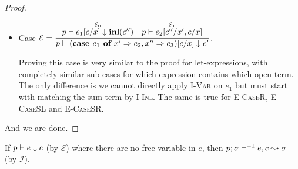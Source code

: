 \begin{proof}
\begin{itemize}
        An analogous proof occurs when $\mathcal{E}$ is a derivation of an
        inverse function call.

    \item Case $\mathcal{E} =
      \dfrac
        {\begin{array}{cc}
            \overset
              {\mathcal{E}_0}
              {p \vdash e_1 [c / x] \downarrow \textbf{inl}(c'')} &
            \overset
              {\mathcal{E}_1}
              {p \vdash e_2 [c'' / x', c / x]}
         \end{array}
        }
        {p \vdash (\textbf{case } e_1 \textbf{ of } x' \Rightarrow e_2, x'' \Rightarrow e_3) [c / x] \downarrow c'}$.

        Proving this case is very similar to the proof for let-expressions,
        with completely similar sub-cases for which expression contains which
        open term. The only difference is we cannot directly apply
        \textsc{I-Var} on $e_1$ but must start with matching the sum-term by
        \textsc{I-Inl}. The same is true for \textsc{E-CaseR},
        \textsc{E-CaseSL} and \textsc{E-CaseSR}.

  \end{itemize}

And we are done.

\end{proof}

\begin{lemma}\label{thm:emptyinv}

  If $p \vdash e \downarrow c$ (by $\mathcal{E}$) where there are no free
  variable in $e$, then $p;\sigma\vdash^{-1} e, c \leadsto \sigma$ (by $\mathcal{I}$).

\end{lemma}


